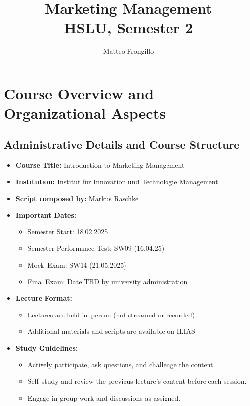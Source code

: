 \documentclass[12pt,a4paper]{report}
\title{Marketing Management\\HSLU, Semester 2}
\author{Matteo Frongillo}
\date{}
\begin{document}
\maketitle
\tableofcontents
\newpage

\chapter{Course Overview and Organizational Aspects}

\section{Administrative Details and Course Structure}
\begin{itemize}
    \item \textbf{Course Title:} Introduction to Marketing Management
    \item \textbf{Institution:} Institut f\"ur Innovation und Technologie Management
    \item \textbf{Script composed by:} Markus Raschke
    \item \textbf{Important Dates:}
    \begin{itemize}
         \item Semester Start: 18.02.2025
         \item Semester Performance Test: SW09 (16.04.25)
         \item Mock--Exam: SW14 (21.05.2025)
         \item Final Exam: Date TBD by university administration
    \end{itemize}
    \item \textbf{Lecture Format:}
    \begin{itemize}
         \item Lectures are held in--person (not streamed or recorded)
         \item Additional materials and scripts are available on ILIAS
    \end{itemize}
    \item \textbf{Study Guidelines:}
    \begin{itemize}
         \item Actively participate, ask questions, and challenge the content.
         \item Self--study and review the previous lecture’s content before each session.
         \item Engage in group work and discussions as assigned.
    \end{itemize}
\end{itemize}
\end{document}
